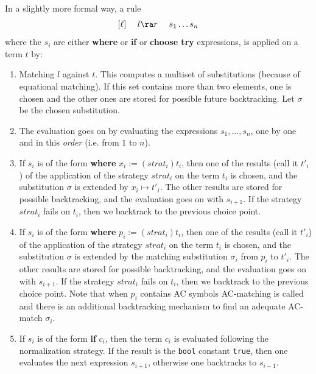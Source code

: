 In a slightly more formal way, a rule
$$
[\ell]~~~~  l \ra r ~~~~ s_1 \ldots s_n
$$
where the $s_i$ are either {\bf where} or {\bf if} or {\bf choose try}
expressions, is applied on a term $t$ by: 
\begin{enumerate}
\item Matching $l$ against $t$. This computes a multiset of
        substitutions (because of equational matching). If this set
        contains more than two elements, one is chosen and the other
        ones are stored for possible future backtracking. Let $\sigma$
        be the chosen substitution.
\item The evaluation goes on by evaluating the expressions
        $s_1,\ldots,s_n$, one by one and in this {\em order}
        (i.e. from $1$ to $n$).
\item If $s_i$ is of the form {\bf where} $x_i := (strat_i) t_i$, then
        one of the results (call it $t'_i$) of the application of the
        strategy $strat_i$ on the term $t_i$ is chosen, and the
        substitution $\sigma$ is extended by $x_i \mapsto t'_i$. The
        other results are stored for possible backtracking, and the
        evaluation goes on with $s_{i+1}$. If the strategy
        $strat_i$ fails on $t_i$, then we backtrack to the previous
        choice point.
\item If $s_i$ is of the form {\bf where} $p_i := (strat_i) t_i$, then
        one of the results (call it $t'_i$) of the application of the
        strategy $strat_i$ on the term $t_i$ is chosen, and the
        substitution $\sigma$ is extended by the matching substitution
        $\sigma_i$ from $p_i$ to $t'_i$. The
        other results are stored for possible backtracking, and the
        evaluation goes on with $s_{i+1}$. If the strategy
        $strat_i$ fails on $t_i$, then we backtrack to the previous
        choice point. Note that when $p_i$ contains AC symbols
        AC-matching is called and there is an additional backtracking
        mechanism to find an adequate AC-match $\sigma_i$.
\item If $s_i$ is of the form {\bf if} $c_i$, then the term $c_i$ is
        evaluated following the normalization strategy. If the result
        is the {\tt bool} constant {\tt true}, then one evaluates
        the next expression $s_{i+1}$, otherwise one backtracks to
        $s_{i-1}$.


\end{enumerate}
